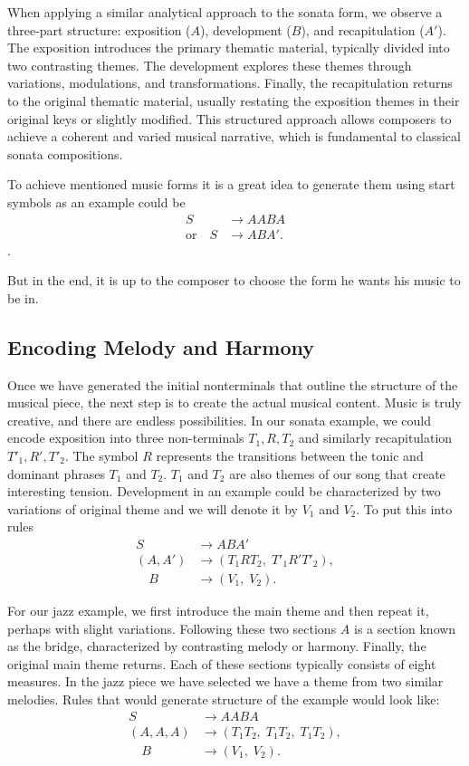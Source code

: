 When applying a similar analytical approach to the sonata form, we observe a three-part structure: exposition ($A$), development ($B$), and recapitulation ($A'$). The exposition introduces the primary thematic material, typically divided into two contrasting themes. The development explores these themes through variations, modulations, and transformations. Finally, the recapitulation returns to the original thematic material, usually restating the exposition themes in their original keys or slightly modified. This structured approach allows composers to achieve a coherent and varied musical narrative, which is fundamental to classical sonata compositions.

To achieve mentioned music forms it is a great idea to generate them using start symbols as an example could be 
\begin{align*}
S &\rightarrow AABA \\
\text{or} \quad S &\rightarrow ABA'.
\end{align*}.

But in the end, it is up to the composer to choose the form he wants his music to be in.

\subsection*{Encoding Melody and Harmony}
Once we have generated the initial nonterminals that outline the structure of the musical piece, the next step is to create the actual musical content. Music is truly creative, and there are endless possibilities. In our sonata example, we could encode exposition into three non-terminals $T_1, R, T_2$ and similarly recapitulation $T'_1, R', T'_2$. The symbol $R$ represents the transitions between the tonic and dominant phrases $T_1$ and $T_2$. $T_1$ and $T_2$ are also themes of our song that create interesting tension. Development in an example could be characterized by two variations of original theme and we will denote it by $V_1$ and $V_2$. To put this into rules 
\begin{align*}
S &\rightarrow ABA' \\
(A,A') &\rightarrow (T_1RT_2,\; T'_1R'T'_2), \\
\quad B &\rightarrow (V_1,\; V_2).
\end{align*}

For our jazz example, we first introduce the main theme and then repeat it, perhaps with slight variations. Following these two sections $A$ is a section known as the bridge, characterized by contrasting melody or harmony. Finally, the original main theme returns. Each of these sections typically consists of eight measures. In the jazz piece we have selected we have a theme from two similar melodies. Rules that would generate structure of the example would look like:
\begin{align*}
S &\rightarrow AABA \\
(A,A,A) &\rightarrow (T_1T_2,\; T_1T_2,\; T_1T_2), \\
\quad B &\rightarrow (V_1,\; V_2).
\end{align*}

